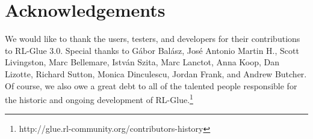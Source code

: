 \documentclass[twoside,11pt]{article}
\begin{document}
\section{Acknowledgements}
We would like to thank the users, testers, and developers for their contributions to RL-Glue 3.0. Special thanks to 
G\'{a}bor Bal\'{a}sz,  %
Jos\'{e} Antonio Martin H.,  %
Scott Livingston, %
Marc Bellemare, 
Istv\'{a}n Szita,  %
Marc Lanctot, 
Anna Koop, 
Dan Lizotte,
Richard Sutton,
Monica Dinculescu,
Jordan Frank, and
Andrew Butcher.  Of course, we also owe a great debt to all of the talented people responsible for the historic and ongoing development of RL-Glue.\footnote{http://glue.rl-community.org/contributors-history}

%
%




\setlength{\bibsep}{6pt}

\end{document}
